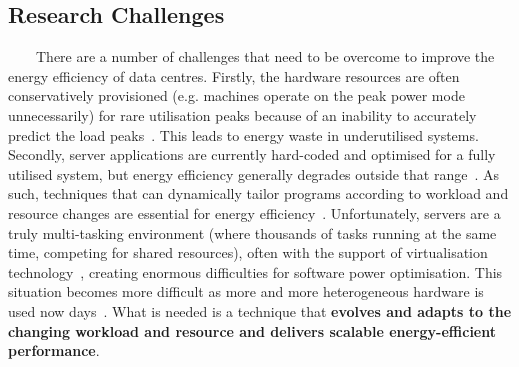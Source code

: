 \subsection{Research Challenges}
~~~~There are a number of challenges that need to be overcome to improve the energy efficiency of data centres. Firstly, the hardware resources are often conservatively provisioned (e.g. machines operate on the peak power mode unnecessarily) for rare utilisation peaks because of an inability to accurately predict the load peaks~\cite{energy-aware,towardsenergyeff}. This leads to energy waste in underutilised systems. Secondly, server applications are currently hard-coded and optimised for a fully utilised system, but energy efficiency generally degrades outside that range~\cite{towardsenergyeff,autodatacentre}. As such, techniques that can dynamically tailor programs according to workload and resource changes are essential for energy efficiency~\cite{towardsenergyeff}. Unfortunately, servers are a truly multi-tasking environment (where thousands of tasks running at the same time, competing for shared resources), often with the support of virtualisation technology~\cite{energy-effcloud}, creating enormous difficulties for software power optimisation. This situation becomes more difficult as more and more heterogeneous hardware is used now days~\cite{aview}. What is needed is a technique that \textbf{evolves and adapts to the changing workload and resource and delivers scalable energy-efficient performance}.

